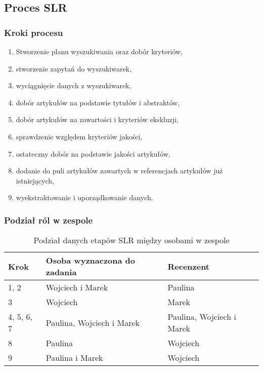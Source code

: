\documentclass[polish,envcountsect,10pt]{article}
\begin{document}
\subsection{Proces SLR}

\subsubsection{Kroki procesu}

\begin{enumerate}
	\item Stworzenie planu wyszukiwania oraz dobór kryteriów,
	\item stworzenie zapytań do wyszukiwarek,
	\item wyciągnięcie danych z wyszukiwarek,
	\item dobór artykułów na podstawie tytułów i abstraktów,
	\item dobór artykułów na zawartości i kryteriów ekskluzji,
	\item sprawdzenie względem kryteriów jakości,
	\item ostateczny dobór na podstawie jakości artykułów,
	\item dodanie do puli artykułów zawartych w referencjach artykułów już istniejących,
	\item wyekstraktowanie i uporządkowanie danych.
\end{enumerate}

\subsubsection{Podział ról w zespole}

\begin{table}[H]
    \caption{Podział danych etapów SLR między osobami w zespole}
    \centering
    \begin{tabular}{|p{1.5cm}|p{5cm}|p{5cm}|}
        \hline
        Krok & Osoba wyznaczona do zadania & Recenzent\\
        \hline
        1, 2 & Wojciech i Marek  & Paulina\\
        \hline
        3 & Wojciech & Marek\\
        \hline
        4, 5, 6, 7 & Paulina, Wojciech i Marek & Paulina, Wojciech i Marek\\
        \hline
        8 & Paulina & Wojciech\\
        \hline
        9 & Paulina i Marek & Wojciech\\
        \hline
    \end{tabular}
\end{table}
\end{document}
